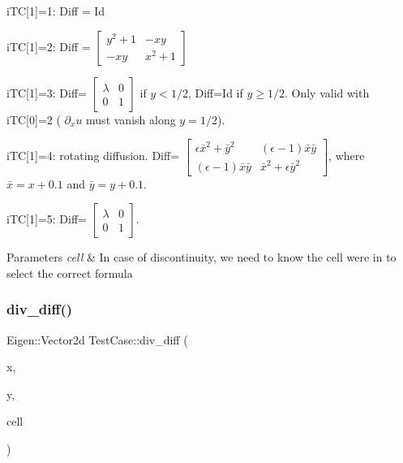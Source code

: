 i\+TC\mbox{[}1\mbox{]}=1\+: Diff = Id

i\+TC\mbox{[}1\mbox{]}=2\+: Diff = $\left[\begin{array}{cc}y^2+1 & -xy\\ -xy & x^2+1\end{array}\right]$

i\+TC\mbox{[}1\mbox{]}=3\+: Diff= $\left[\begin{array}{cc}\lambda & 0\\ 0 & 1\end{array}\right]$ if $y<1/2$, Diff=Id if $y\ge 1/2$. Only valid with i\+TC\mbox{[}0\mbox{]}=2 ( $\partial_x u$ must vanish along $y=1/2$).

i\+TC\mbox{[}1\mbox{]}=4\+: rotating diffusion. Diff= $\left[\begin{array}{cc}\epsilon \bar{x}^2 + \bar{y}^2 & (\epsilon-1)\bar{x}\bar{y}\\ (\epsilon-1)\bar{x}\bar{y} & \bar{x}^2+\epsilon \bar{y}^2\end{array}\right]$, where $\bar{x}=x+0.1$ and $\bar{y}=y+0.1$.

i\+TC\mbox{[}1\mbox{]}=5\+: Diff= $\left[\begin{array}{cc}\lambda & 0\\ 0 & 1\end{array}\right]$. 
\begin{DoxyParams}{Parameters}
{\em cell} & In case of discontinuity, we need to know the cell we\textquotesingle{}re in to select the correct formula \\
\hline
\end{DoxyParams}
\mbox{\label{classTestCase_aa32221ff5dd860c050a28661406a87dc}} 
\subsubsection{\texorpdfstring{div\+\_\+diff()}{div\_diff()}}
{\footnotesize\ttfamily Eigen\+::\+Vector2d Test\+Case\+::div\+\_\+diff (\begin{DoxyParamCaption}\item[{const double}]{x,  }\item[{const double}]{y,  }\item[{const \hyperlink{classHArDCore2D_1_1Cell}{Cell} $\ast$}]{cell }\end{DoxyParamCaption})}



